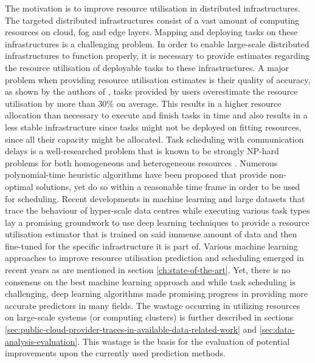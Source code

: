             The motivation is to improve resource utilisation in distributed infrastructures. The targeted distributed infrastructures consist of a vast amount of computing resources on cloud, fog and edge layers.
            Mapping and deploying tasks on these infrastructures is a challenging problem. In order to enable large-scale distributed infrastructures to function properly, it is necessary to provide estimates regarding the resource utilisation of deployable tasks to these infrastructures.
            A major problem when providing resource utilisation estimates is their quality of accuracy, as shown by the authors of \cite{thonglekImprovingResourceUtilization2019}, tasks provided by users overestimate the resource utilisation by more than $30\%$ on average. 
            This results in a higher resource allocation than necessary to execute and finish tasks in time and also results in a less stable infrastructure since tasks might not be deployed on fitting resources, since all their capacity might be allocated.
            Task scheduling with communication delays is a well-researched problem that is known to be strongly NP-hard problems for both homogeneous and heterogeneous resources \cite{orrOptimalTaskScheduling2021}.
            Numerous polynomial-time heuristic algorithms have been proposed that provide non-optimal solutions, yet do so within a reasonable time frame in order to be used for scheduling. Recent developments in machine learning and large datasets that trace the behaviour of hyper-scale data centres \cite{vanooteghemWhatHyperscaleData2023} while executing various task types lay a promising groundwork to use deep learning techniques to provide a resource utilisation estimator that is trained on said immense amount of data and then fine-tuned for the specific infrastructure it is part of. 
            Various machine learning approaches to improve resource utilisation prediction and scheduling emerged in recent years as are mentioned in section \ref{ch:state-of-the-art}. Yet, there is no consensus on the best machine learning approach and while task scheduling is challenging, deep learning algorithms made promising progress in providing more accurate predictors in many fields.
            The wastage occurring in utilizing resources on large-scale systems (or computing clusters) is further described in sections \ref{sec:public-cloud-provider-traces-in-available-data-related-work} and \ref{sec:data-analysis-evaluation}.
            This wastage is the basis for the evaluation of potential improvements upon the currently used prediction methods.
            
